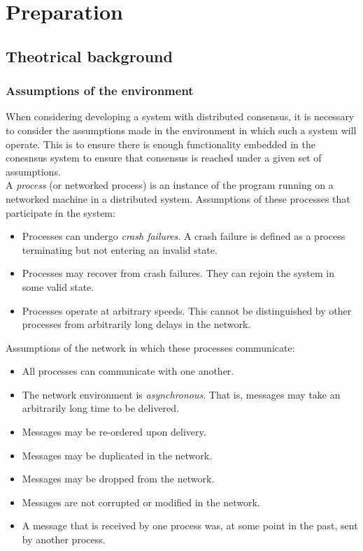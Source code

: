 \chapter{Preparation}



\section{Theotrical background}

\subsection{Assumptions of the environment}
When considering developing a system with distributed consensus, it is necessary to consider the assumptions made in the environment in which such a system will operate. This is to ensure there is enough functionality embedded in the conesnsus system to ensure that consensus is reached under a given set of assumptions. \\

A \emph{process} (or networked process) is an instance of the program running on a networked machine in a distributed system. Assumptions of these processes that participate in the system:

\begin{itemize}
  \item Processes can undergo \emph{crash failures}. A crash failure is defined as a process terminating but not entering an invalid state.
  \item Processes may recover from crash failures. They can rejoin the system in some valid state. 
  \item Processes operate at arbitrary speeds. This cannot be distinguished by other processes from arbitrarily long delays in the network.
\end{itemize}

Assumptions of the network in which these processes communicate:

\begin{itemize}
  \item All processes can communicate with one another.
  \item The network environment is \emph{asynchronous}. That is, messages may take an arbitrarily long time to be delivered.
  \item Messages may be re-ordered upon delivery.
  \item Messages may be duplicated in the network.
  \item Messages may be dropped from the network.
  \item Messages are not corrupted or modified in the network.
  \item A message that is received by one process was, at some point in the past, sent by another process.
\end{itemize}

